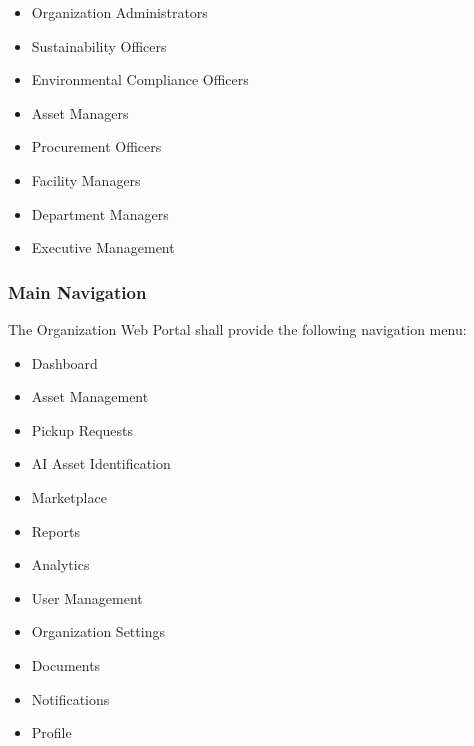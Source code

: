\begin{itemize}

\item Organization Administrators

\item Sustainability Officers

\item Environmental Compliance Officers

\item Asset Managers

\item Procurement Officers

\item Facility Managers

\item Department Managers

\item Executive Management

\end{itemize}


\subsubsection*{Main Navigation}

The Organization Web Portal shall provide the following navigation menu:

\begin{itemize}

\item Dashboard

\item Asset Management

\item Pickup Requests

\item AI Asset Identification

\item Marketplace

\item Reports

\item Analytics

\item User Management

\item Organization Settings

\item Documents

\item Notifications

\item Profile

\end{itemize}

